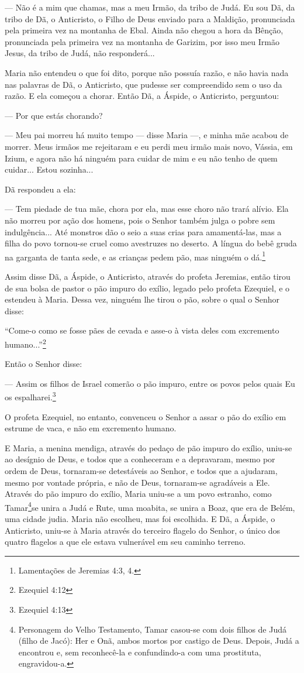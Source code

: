 --- Não é a mim que chamas, mas a meu Irmão, da tribo de Judá. Eu sou
Dã, da tribo de Dã, o Anticristo, o Filho de Deus enviado para a
Maldição, pronunciada pela primeira vez na montanha de Ebal. Ainda não
chegou a hora da Bênção, pronunciada pela primeira vez na montanha de
Garizim, por isso meu Irmão Jesus, da tribo de Judá, não responderá...

Maria não entendeu o que foi dito, porque não possuía razão, e não havia
nada nas palavras de Dã, o Anticristo, que pudesse ser compreendido sem
o uso da razão. E ela começou a chorar. Então Dã, a Áspide, o
Anticristo, perguntou:

--- Por que estás chorando?

--- Meu pai morreu há muito tempo --- disse Maria ---, e minha mãe
acabou de morrer. Meus irmãos me rejeitaram e eu perdi meu irmão mais
novo, Vássia, em Izium, e agora não há ninguém para cuidar de mim e eu
não tenho de quem cuidar... Estou sozinha...

Dã respondeu a ela:

--- Tem piedade de tua mãe, chora por ela, mas esse choro não trará
alívio. Ela não morreu por ação dos homens, pois o Senhor também julga o
pobre sem indulgência... Até monstros dão o seio a suas crias para
amamentá-las, mas a filha do povo tornou-se cruel como avestruzes no
deserto. A língua do bebê gruda na garganta de tanta sede, e as crianças
pedem pão, mas ninguém o dá.\footnote{Lamentações de Jeremias 4:3, 4.}

Assim disse Dã, a Áspide, o Anticristo, através do profeta Jeremias,
então tirou de sua bolsa de pastor o pão impuro do exílio, legado pelo
profeta Ezequiel, e o estendeu à Maria. Dessa vez, ninguém lhe tirou o
pão, sobre o qual o Senhor disse:

``Come-o como se fosse pães de cevada e asse-o à vista deles com
excremento humano...''\footnote{Ezequiel 4:12}

Então o Senhor disse:

--- Assim os filhos de Israel comerão o pão impuro, entre os povos pelos
quais Eu os espalharei.\footnote{Ezequiel 4:13}

O profeta Ezequiel, no entanto, convenceu o Senhor a assar o pão do
exílio em estrume de vaca, e não em excremento humano.

E Maria, a menina mendiga, através do pedaço de pão impuro do exílio,
uniu-se ao desígnio de Deus, e todos que a conheceram e a depravaram,
mesmo por ordem de Deus, tornaram-se detestáveis ao Senhor, e todos que
a ajudaram, mesmo por vontade própria, e não de Deus, tornaram-se
agradáveis a Ele. Através do pão impuro do exílio, Maria uniu-se a um
povo estranho, como Tamar\footnote{Personagem do Velho Testamento, Tamar
  casou-se com dois filhos de Judá (filho de Jacó): Her e Onã, ambos
  mortos por castigo de Deus. Depois, Judá a encontrou e, sem
  reconhecê-la e confundindo-a com uma prostituta, engravidou-a.}se
unira a Judá e Rute, uma moabita, se unira a Boaz, que era de Belém, uma
cidade judia. Maria não escolheu, mas foi escolhida. E Dã, a Áspide, o
Anticristo, uniu-se à Maria através do terceiro flagelo do Senhor, o
único dos quatro flagelos a que ele estava vulnerável em seu caminho
terreno.

